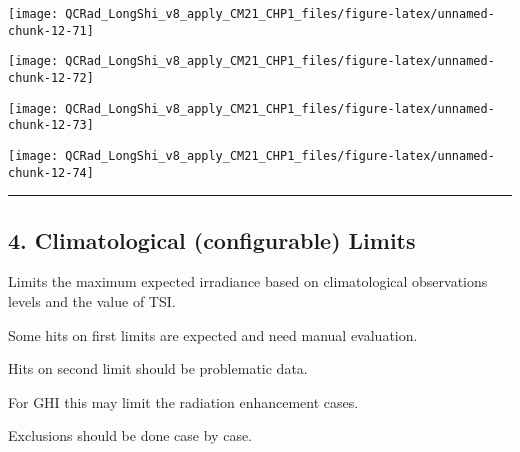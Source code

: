 \documentclass[
  10pt,
  a4paper,oneside]{article}
\begin{document}
\begin{center}\texttt{[image: QCRad\_LongShi\_v8\_apply\_CM21\_CHP1\_files/figure-latex/unnamed-chunk-12-71]} \end{center}

\begin{center}\texttt{[image: QCRad\_LongShi\_v8\_apply\_CM21\_CHP1\_files/figure-latex/unnamed-chunk-12-72]} \end{center}

\begin{center}\texttt{[image: QCRad\_LongShi\_v8\_apply\_CM21\_CHP1\_files/figure-latex/unnamed-chunk-12-73]} \end{center}

\begin{center}\texttt{[image: QCRad\_LongShi\_v8\_apply\_CM21\_CHP1\_files/figure-latex/unnamed-chunk-12-74]} \end{center}

\begin{center}\rule{0.5\linewidth}{0.5pt}\end{center}

\newpage

\hypertarget{climatological-configurable-limits}{%
\subsection{4. Climatological (configurable) Limits}\label{climatological-configurable-limits}}

Limits the maximum expected irradiance based on climatological
observations levels and the value of TSI.

Some hits on first limits are expected and need manual evaluation.

Hits on second limit should be problematic data.

For GHI this may limit the radiation enhancement cases.

Exclusions should be done case by case.
\end{document}
